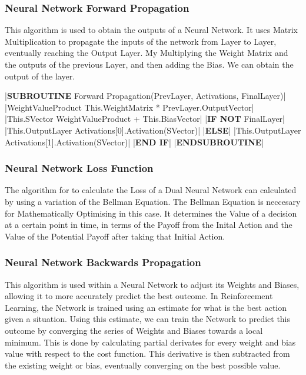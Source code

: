 \begin{flushleft}
            \subsubsection{Neural Network Forward Propagation}
                This algorithm is used to obtain the outputs of a Neural Network. It uses Matrix Multiplication to propagate the inputs
                of the network from Layer to Layer, eventually reaching the Output Layer. My Multiplying the Weight Matrix and the outputs
                of the previous Layer, and then adding the Bias. We can obtain the output of the layer.

                \vspace{0.2cm}
                \begin{pseudocode}
|\textbf{SUBROUTINE} Forward Propagation(PrevLayer, Activations, FinalLayer)|
    |WeightValueProduct \leftarrow This.WeightMatrix * PrevLayer.OutputVector|
    |This.SVector \leftarrow WeightValueProduct + This.BiasVector|
    |\textbf{IF NOT} FinalLayer|
        |This.OutputLayer \leftarrow Activations[0].Activation(SVector)|
    |\textbf{ELSE}|
        |This.OutputLayer \leftarrow Activations[1].Activation(SVector)|
    |\textbf{END IF}| 
|\textbf{ENDSUBROUTINE}|
                \end{pseudocode}

                \vspace{0.5cm}
            \subsubsection{Neural Network Loss Function}
                The algorithm for to calculate the Loss of a Dual Neural Network can calculated by using a variation of the Bellman Equation.
                The Bellman Equation is neccesary for Mathematically Optimising in this case. It determines the Value of a decision at a certain 
                point in time, in terms of the Payoff from the Inital Action and the Value of the Potential Payoff after taking that Initial
                Action. 
                
                \vspace{0.5cm}
            \subsubsection{Neural Network Backwards Propagation}
                This algorithm is used within a Neural Network to adjust its Weights and Biases, allowing it to more accurately predict the
                best outcome. In Reinforcement Learning, the Network is trained using an estimate for what is the best action given a situation.
                Using this estimate, we can train the Network to predict this outcome by converging the series of Weights and Biases towards a
                local minimum. This is done by calculating partial derivates for every weight and bias value with respect to the cost function.
                This derivative is then subtracted from the existing weight or bias, eventually converging on the best possible value.


\end{flushleft}
